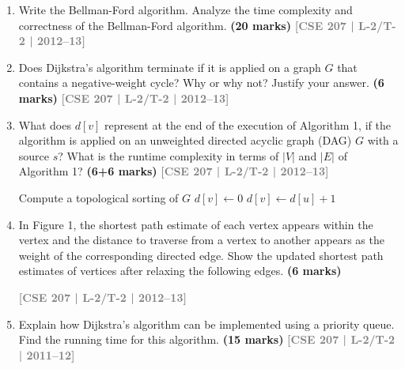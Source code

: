 \documentclass[12pt,a3paper]{article}
\newcommand{\yr}[1]{\hfill\textcolor{gray}{\small\textbf{[#1]}}}
\newcommand{\mk}[1]{\textcolor{orange!70!black}{\small\textbf{(#1 marks)}}}
\begin{document}
\begin{enumerate}
\item Write the Bellman-Ford algorithm. Analyze the time complexity and correctness of the Bellman-Ford algorithm. \mk{20}
\yr{CSE 207 | L-2/T-2 | 2012--13}

\item Does Dijkstra's algorithm terminate if it is applied on a graph $G$ that contains a negative-weight cycle? Why or why not? Justify your answer. \mk{6}
\yr{CSE 207 | L-2/T-2 | 2012--13}

\item What does $d[v]$ represent at the end of the execution of Algorithm 1, if the algorithm is applied on an unweighted directed acyclic graph (DAG) $G$ with a source $s$? What is the runtime complexity in terms of $|V|$ and $|E|$ of Algorithm 1? \mk{6+6}
\yr{CSE 207 | L-2/T-2 | 2012--13}

\begin{algorithm}[H]
\caption{\textsc{LongestPath-DAG}($G$)}
\begin{algorithmic}[1]
\State Compute a topological sorting of $G$
    \State $d[v] \gets 0$
\EndFor
{}
            \State $d[v] \gets d[u] + 1$
        \EndIf
    \EndFor
\EndFor
\end{algorithmic}
\end{algorithm}
 
\item In Figure 1, the shortest path estimate of each vertex appears within the vertex and the distance to traverse from a vertex to another appears as the weight of the corresponding directed edge. Show the updated shortest path estimates of vertices after relaxing the following edges. \mk{6}

\begin{center}
\end{center}
\yr{CSE 207 | L-2/T-2 | 2012--13}

\item Explain how Dijkstra's algorithm can be implemented using a priority queue. Find the running time for this algorithm. \mk{15}
\yr{CSE 207 | L-2/T-2 | 2011--12}

\end{enumerate}
\end{document}
